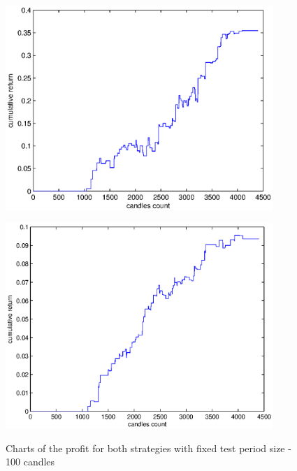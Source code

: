 \documentclass{tewiart}
\begin{document}
\begin{figure}[h!]
\centering
\begin{minipage}{.45\linewidth}
\begin{center}
\includegraphics[width=0.9\textwidth]{pictures/mic_100.eps}
\label{MiC100}
\end{center}
\end{minipage}
\begin{minipage}{.45\linewidth}
\begin{center}
\includegraphics[width=0.9\textwidth]{pictures/mid_100.eps}
\label{MiD100}
\end{center}
\end{minipage}

\caption{Charts of the profit for both strategies with fixed test period size - 100 candles}
\end{figure}
\FloatBarrier
\end{document}

